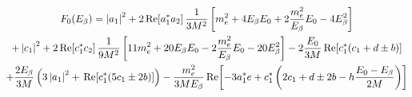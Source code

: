 %
%
%
\begin{multline}
F_0(E_{\beta}) = 
\left| a_1 \right|^2 
+ 2 \,\mathrm{Re}\!\left[ a_1^* a_2 \right] \frac{1}{3 M^2} 
\left[  
	m_e^2 + 4 E_{\beta} E_0 + 2 \frac{m_e^2}{E_{\beta}}E_0 - 4E_{\beta}^2
\right]
\\
+ \left| c_1 \right|^2
+ 2 \,\mathrm{Re}\!\left[ c_1^* c_2\right] \frac{1}{9 M^2} 
\left[
	11 m_e^2 + 20 E_{\beta} E_0 
	- 2\frac{m_e^2}{E_{\beta}}E_0
	- 20E_{\beta}^2
\right]
- 2 \frac{E_0}{3M} \,\mathrm{Re}\!\left[ c_1^*(c_1 + d \pm b)\right]
\\
+ \frac{2E_{\beta}}{3M} 
\left( 
	3 \left| a_1 \right|^2 + \,\mathrm{Re}\! \left[ c_1^*(5c_1 \pm 2 b) \right]
\right)
- \frac{m_e^2}{3 M E_{\beta}} 
\,\mathrm{Re}\! \left[ 
	-3 a_1^*e + c_1^*\left(2c_1 + d \pm 2b - h\frac{E_0 - E_{\beta}}{2M} \right)
\right]
\end{multline}
%